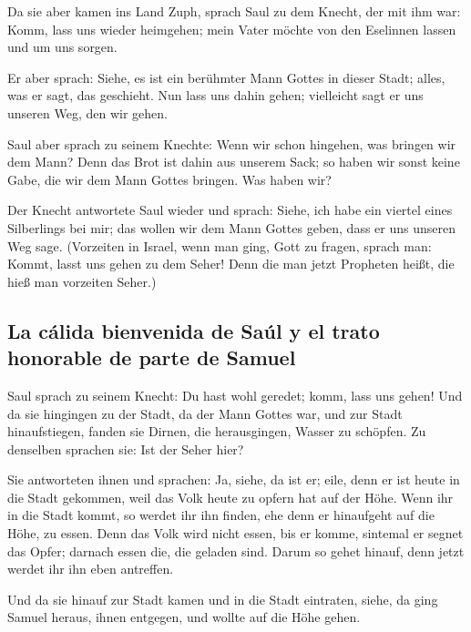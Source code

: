  Da sie aber kamen ins Land Zuph, sprach Saul zu dem
Knecht, der mit ihm war: Komm, lass uns wieder heimgehen; mein Vater
möchte von den Eselinnen lassen und um uns sorgen.

 Er aber sprach: Siehe, es ist ein berühmter Mann Gottes
in dieser Stadt; alles, was er sagt, das geschieht. Nun lass uns dahin
gehen; vielleicht sagt er uns unseren Weg, den wir gehen.

 Saul aber sprach zu seinem Knechte: Wenn wir schon
hingehen, was bringen wir dem Mann? Denn das Brot ist dahin aus unserem
Sack; so haben wir sonst keine Gabe, die wir dem Mann Gottes bringen.
Was haben wir?

 Der Knecht antwortete Saul wieder und sprach: Siehe, ich
habe ein viertel eines Silberlings bei mir; das wollen wir dem Mann
Gottes geben, dass er uns unseren Weg sage.  (Vorzeiten in
Israel, wenn man ging, Gott zu fragen, sprach man: Kommt, lasst uns
gehen zu dem Seher! Denn die man jetzt Propheten heißt, die hieß man
vorzeiten Seher.)

\hypertarget{la-cuxe1lida-bienvenida-de-sauxfal-y-el-trato-honorable-de-parte-de-samuel}{%
\subsection{La cálida bienvenida de Saúl y el trato honorable de parte
de
Samuel}\label{la-cuxe1lida-bienvenida-de-sauxfal-y-el-trato-honorable-de-parte-de-samuel}}

 Saul sprach zu seinem Knecht: Du hast wohl geredet;
komm, lass uns gehen! Und da sie hingingen zu der Stadt, da der Mann
Gottes war,  und zur Stadt hinaufstiegen, fanden sie
Dirnen, die herausgingen, Wasser zu schöpfen. Zu denselben sprachen sie:
Ist der Seher hier?

 Sie antworteten ihnen und sprachen: Ja, siehe, da ist
er; eile, denn er ist heute in die Stadt gekommen, weil das Volk heute
zu opfern hat auf der Höhe.  Wenn ihr in die Stadt kommt,
so werdet ihr ihn finden, ehe denn er hinaufgeht auf die Höhe, zu essen.
Denn das Volk wird nicht essen, bis er komme, sintemal er segnet das
Opfer; darnach essen die, die geladen sind. Darum so gehet hinauf, denn
jetzt werdet ihr ihn eben antreffen.

 Und da sie hinauf zur Stadt kamen und in die Stadt
eintraten, siehe, da ging Samuel heraus, ihnen entgegen, und wollte auf
die Höhe gehen.

